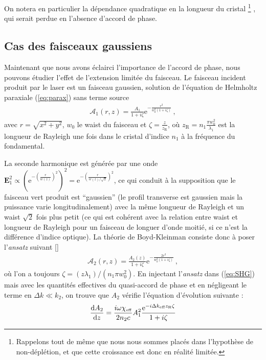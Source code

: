 \documentclass[11pt,a4paper]{article}
\newcommand{\ncite}[1]{[\citenum{#1}]}
\newcommand{\zr}{z_\mathsc{R}}
\newcommand{\A}{\mathcal{A}}
\newcommand{\e}[1]{\text{e}^{#1}}
\newcommand{\mathsc}[1]{\mathrm{\scriptscriptstyle {#1}}}
\renewcommand{\v}[1]{\boldsymbol{\mathbf{#1}}}
\begin{document}
On notera en particulier la dépendance quadratique en la longueur du cristal \footnote{Rappelons tout de même que nous nous sommes placés dans l'hypothèse de non-déplétion, et que cette croissance est donc en réalité limitée.}
, qui serait perdue en l'absence d'accord de phase. 

\subsection{Cas des faisceaux gaussiens} 
\label{gaussien}
Maintenant que nous avons éclairci l'importance de l'accord de phase, nous pouvons étudier l'effet de l'extension limitée du faisceau. Le faisceau incident produit par le laser est un faisceau gaussien, solution de l'équation de Helmholtz paraxiale (\ref{eq:parax}) sans terme source
\begin{align}
\A_1(r,z) = \frac{A_1}{1+i\zeta} \e{-\frac{r^{2}}{w_{0}^{2} (1+i\zeta) }} \,,
\end{align}
avec $r=\sqrt{x^2+y^2}$, $w_0$ le waist du faisceau et $\zeta = \frac{z}{z_\mathsc{R}}$, où $\zr= n_1 \frac{\pi w_0^2}{\lambda_1}$ est la longueur de Rayleigh une fois dans le cristal d'indice $n_1$ à la fréquence du fondamental.

La seconde harmonique est générée par une onde $\v E_1^2 \propto \left( \e{-\left(\frac{r}{w(z)}\right)^2} \right)^2 = \e{-\left(\frac{r}{w(z)/ \sqrt 2}\right)^2}$, ce qui conduit à la supposition que le faisceau vert produit est ``gaussien'' (le profil transverse est gaussien mais la puissance varie longitudinalement) avec la même longueur de Rayleigh et un waist $\sqrt 2$ fois plus petit (ce qui est cohérent avec la relation entre waist et longueur de Rayleigh pour un faisceau de longuer d'onde moitié, si ce n'est la différence d'indice optique).
La théorie de Boyd-Kleinman consiste donc à poser l'\textit{ansatz} suivant \ncite{boyd}
\begin{align}
\A_2(r,z) = \frac{A_2(z)}{1+i\zeta}\e{-\frac{2r^{2}}{w_{0}^{2} (1+i\zeta) }} \,,
\end{align}
où l'on a toujours $\zeta = (z\lambda_1)/(n_1 \pi w_{0}^{2})$. %
En injectant l'\textit{ansatz} dans (\ref{eq:SHG}) mais avec les quantités effectives du quasi-accord de phase et en négligeant le terme en $\Delta k \ll k_2$, on trouve que $A_2$ vérifie l'équation d'évolution suivante :
\begin{align} 
	\dv{A_2}{z} = \frac{i\omega \chi_\mathsc{eff}}{2 n_2 c} A_1^2 \frac{\e{-i\Delta k_\mathsc{eff} \zr \zeta}}{1+i\zeta} 
	\label{eq:BKDE}
\end{align}
\end{document}
